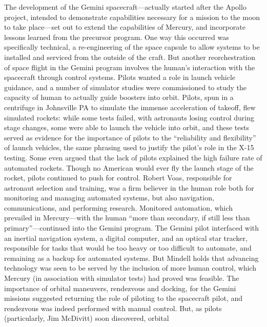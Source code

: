 The development of the Gemini spacecraft---actually started after the
Apollo project, intended to demonstrate capabilities necessary for
a mission to the moon to take place---set out to extend the
capabilities of Mercury, and incorporate lessons learned from the
precursor program. One way this occurred was specifically technical, a
re-engineering of the space capsule to allow systems to be installed
and serviced from the outside of the craft\cite{???}. But another
reorchestration of space flight in the Gemini program involves the
human's interaction with the spacecraft through control systems.
Pilots wanted a role in launch vehicle guidance, and a number of
simulator studies were commissioned to study the capacity of human to
actually guide boosters into orbit\cite{???}. Pilots, spun in a
centrifuge in Johnsville PA to simulate the immense acceleration of
takeoff, flew
simulated rockets: while some tests failed, with astronauts losing
control during stage changes, some were able to launch the vehicle
into orbit, and these tests served as evidence for the importance of
pilots to the ``reliability and flexibility'' of launch vehicles,
the same phrasing used to justify the pilot's role in the X-15
testing\cite[p. 72]{???-DM}. Some even argued that the lack of pilots
explained the high failure rate of automated rockets\cite[p.
  73]{???-DM}. Though no American would ever fly the launch stage of
the rocket, pilots continued to push for control. Robert Voas,
responsible for astronaut selection and training, was a firm believer
in the human role both for monitoring and managing automated systems,
but also 
navigation, communications, and performing research\cite[p.
  77]{???-DM}. Monitored automation, which prevailed in Mercury---with
the human ``more than secondary, if still less than primary''\cite[p.
  77]{???-DM}---continued into the Gemini program. The Gemini pilot
interfaced with an inertial navigation system, a digital computer, and
an optical star tracker, responsible for tasks that would be too heavy
or too difficult to automate, and remaining as a backup for automated
systems\cite[p. 83]{???-DM}. But Mindell holds that advancing
technology was seen to be served by the inclusion of more human
control, which Mercury (in association with simulator tests) had proved was
feasible\cite[p. 84]{???-DM}. The importance of orbital maneuvers,
rendezvous and docking, for the Gemini missions suggested returning
the role of piloting to the spacecraft pilot, and rendezvous was
indeed performed with manual control\cite[p. 84]{???-DM}. But, as
pilots (particularly, Jim McDivitt) soon discovered, orbital
